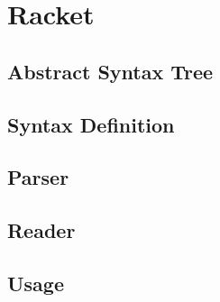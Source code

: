 \section{Racket}

\subsection{Abstract Syntax Tree}



\subsection{Syntax Definition}



\subsection{Parser}



\subsection{Reader}



\subsection{Usage}


